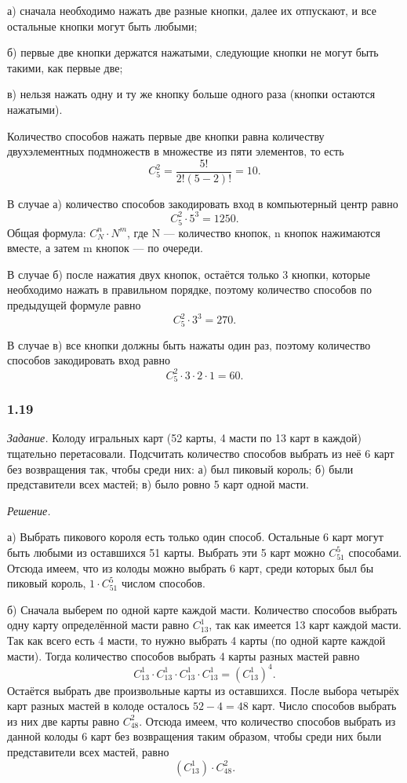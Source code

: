 \documentclass{book}
\begin{document}
а) сначала необходимо нажать две разные кнопки, далее их отпускают, и все остальные кнопки могут быть любыми; 

б) первые две кнопки держатся нажатыми, следующие кнопки не могут быть такими, как первые две; 

в) нельзя нажать одну и ту же кнопку больше одного раза (кнопки остаются нажатыми).

Количество способов нажать первые две кнопки равна количеству двухэлементных подмножеств в множестве из пяти элементов, то есть
$$ C_5^2 = \frac{5!}{2! \left( 5 - 2 \right)!} = 10.$$

В случае а) количество способов закодировать вход в компьютерный центр равно
$$ C_5^2 \cdot 5^3 = 1250.$$
Общая формула: $ C_N^n \cdot N^m $, где N --- количество кнопок, n кнопок нажимаются вместе, а затем m кнопок --- по очереди.

В случае б) после нажатия двух кнопок, остаётся только 3 кнопки, которые необходимо нажать в правильном порядке,
поэтому количество способов по предыдущей формуле равно
$$ C_5^2 \cdot 3^3 = 270.$$

В случае в) все кнопки должны быть нажаты один раз, поэтому количество способов закодировать вход равно
$$ C_5^2 \cdot 3 \cdot 2 \cdot 1 = 60.$$

\subsubsection*{1.19}

\textit{Задание.} Колоду игральных карт (52 карты, 4 масти по 13 карт в каждой) тщательно перетасовали.
Подсчитать количество способов выбрать из неё 6 карт без возвращения так, чтобы среди них:
а) был пиковый король;
б) были представители всех мастей;
в) было ровно 5 карт одной масти.

\textit{Решение.}

а) Выбрать пикового короля есть только один способ.
Остальные 6 карт могут быть любыми из оставшихся 51 карты.
Выбрать эти 5 карт можно $ C_{51}^5 $ способами.
Отсюда имеем, что из колоды можно выбрать 6 карт, среди которых был бы пиковый король, $ 1 \cdot C_{51}^5 $ числом способов.

б) Сначала выберем по одной карте каждой масти.
Количество способов выбрать одну карту определённой масти равно $C_{13}^1$, так как имеется 13 карт каждой масти.
Так как всего есть 4 масти, то нужно выбрать 4 карты (по одной карте каждой масти).
Тогда количество способов выбрать 4 карты разных мастей равно
$$ C_{13}^1 \cdot C_{13}^1 \cdot C_{13}^1 \cdot C_{13}^1 =
\left( C_{13}^1 \right)^4.$$
Остаётся выбрать две произвольные карты из оставшихся.
После выбора четырёх карт разных мастей в колоде осталось $ 52 - 4 = 48 $ карт.
Число способов выбрать из них две карты равно $ C_{48}^2 $.
Отсюда имеем, что количество способов выбрать из данной колоды 6 карт без возвращения таким образом, чтобы среди них были представители всех мастей, равно
$$ \left( C_{13}^1 \right) \cdot C_{48}^2.$$
\end{document}
